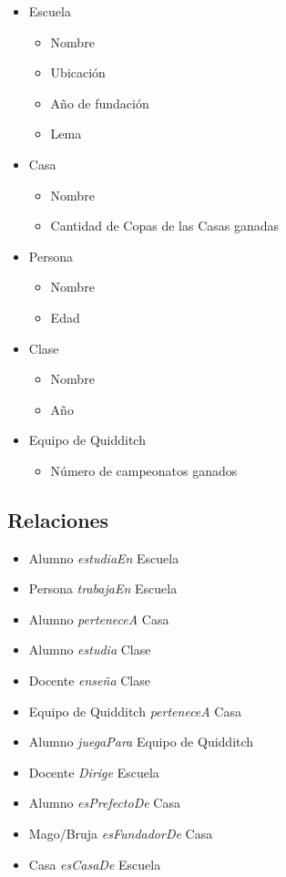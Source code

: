 \documentclass[11pt]{article}
\begin{document}
\begin{itemize}
    \item Escuela
          \begin{itemize}
              \item Nombre
              \item Ubicación
              \item Año de fundación
              \item Lema 
          \end{itemize}
    \item Casa
          \begin{itemize}
              \item Nombre
              \item Cantidad de Copas de las Casas ganadas 
          \end{itemize}
    \item Persona
          \begin{itemize}
              \item Nombre 
              \item Edad
          \end{itemize}
    \item Clase
          \begin{itemize}
              \item Nombre
              \item Año 
          \end{itemize}
    \item Equipo de Quidditch
          \begin{itemize}
              \item Número de campeonatos ganados 
          \end{itemize}
\end{itemize}

\subsection{Relaciones}

\begin{itemize}
    \item Alumno \emph{estudiaEn} Escuela
    \item Persona \emph{trabajaEn} Escuela
    \item Alumno \emph{perteneceA} Casa
    \item Alumno \emph{estudia} Clase
    \item Docente \emph{enseña} Clase
    \item Equipo de Quidditch \emph{perteneceA} Casa
    \item Alumno \emph{juegaPara} Equipo de Quidditch
    \item Docente \emph{Dirige} Escuela
    \item Alumno \emph{esPrefectoDe} Casa
    \item Mago/Bruja \emph{esFundadorDe} Casa
    \item Casa \emph{esCasaDe} Escuela 
\end{itemize}
\end{document}
